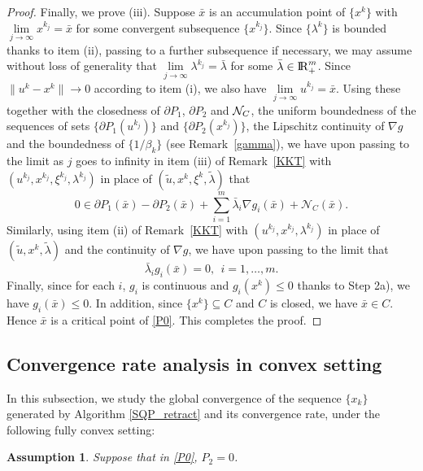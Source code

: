 \documentclass[10pt]{article}
\numberwithin{equation}{section}
\newtheorem{assumption}{Assumption}[section]
\def\R{{\rm I\!R}}
\begin{document}
\begin{proof}
Finally, we prove (iii). Suppose $\bar{x}$ is an accumulation point of $\{x^k\}$ with $\lim\limits_{j\rightarrow\infty}x^{k_j} = \bar{x}$ for some convergent subsequence $\{x^{k_j}\}$. Since $\{\lambda^k\}$ is bounded thanks to item (ii), passing to a further subsequence if necessary, we may assume without loss of generality that $\lim\limits_{j\rightarrow\infty}\lambda^{k_j} = \bar{\lambda}$ for some $\bar\lambda\in \R^m_+$. Since $\|u^k - x^k\|\rightarrow 0$ according to item (i), we also have $\lim\limits_{j\rightarrow\infty}u^{k_j} = \bar{x}$.
Using these together with the closedness of $\partial P_1$, $\partial P_2$ and ${\cal N}_C$, the uniform boundedness of the sequences of sets $\{\partial P_1(u^{k_j})\}$ and $\{\partial P_2(x^{k_j})\}$, the Lipschitz continuity of $\nabla g$ and the boundedness of $\{1/\beta_k\}$ (see Remark~\ref{gamma}), we have upon passing to the limit as $j$ goes to infinity in item (iii) of Remark~\ref{KKT} with $(u^{k_j},x^{k_j},\xi^{k_j},\lambda^{k_j})$ in place of $(\widetilde u,x^k,\xi^k,\widetilde\lambda)$ that
\[
0\in \partial P_1(\bar{x}) - \partial P_2(\bar{x}) + \sum\limits_{i=1}^m\bar{\lambda}_i\nabla g_i(\bar{x}) + \mathcal{N}_C(\bar{x}).
\]
Similarly, using item (ii) of Remark~\ref{KKT} with $(u^{k_j},x^{k_j},\lambda^{k_j})$ in place of $(\widetilde u,x^k,\widetilde\lambda)$ and the continuity of $\nabla g$, we have upon passing to the limit that
\[
\bar{\lambda}_i g_i(\bar{x}) = 0,\ \ i = 1, \ldots, m.
\]
Finally, since for each $i$, $g_i$ is continuous and $g_i(x^k)\leq0$ thanks to Step 2a), we have $g_i(\bar{x})\leq0$. In addition, since $\{x^k\}\subseteq C$ and $C$ is closed, we have $\bar{x}\in C$. Hence $\bar{x}$ is a {\color {blue} critical point} of \eqref{P0}. This completes the proof.
\end{proof}

\subsection{Convergence rate analysis in convex setting}
In this subsection, we study the global convergence of the sequence $\{x_k\}$ generated by Algorithm \ref{SQP_retract} and its convergence rate, under the following fully convex setting:
\begin{assumption}\label{assumption3}
  Suppose that in \eqref{P0}, $P_2 = 0$.
\end{assumption}
\end{document}
